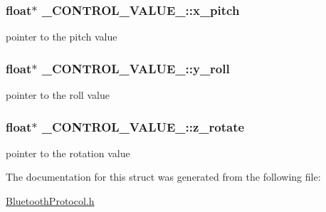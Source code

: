 \subsubsection[{\texorpdfstring{x\+\_\+pitch}{x_pitch}}]{\setlength{\rightskip}{0pt plus 5cm}float$\ast$ \+\_\+\+C\+O\+N\+T\+R\+O\+L\+\_\+\+V\+A\+L\+U\+E\+\_\+\+::x\+\_\+pitch}\hypertarget{struct___c_o_n_t_r_o_l___v_a_l_u_e___a86ebefe208904bd4f58d8c7306dd9f16}{}\label{struct___c_o_n_t_r_o_l___v_a_l_u_e___a86ebefe208904bd4f58d8c7306dd9f16}
pointer to the pitch value 
\subsubsection[{\texorpdfstring{y\+\_\+roll}{y_roll}}]{\setlength{\rightskip}{0pt plus 5cm}float$\ast$ \+\_\+\+C\+O\+N\+T\+R\+O\+L\+\_\+\+V\+A\+L\+U\+E\+\_\+\+::y\+\_\+roll}\hypertarget{struct___c_o_n_t_r_o_l___v_a_l_u_e___a2f8a834c72db81f047ea707ff307cf1d}{}\label{struct___c_o_n_t_r_o_l___v_a_l_u_e___a2f8a834c72db81f047ea707ff307cf1d}
pointer to the roll value 
\subsubsection[{\texorpdfstring{z\+\_\+rotate}{z_rotate}}]{\setlength{\rightskip}{0pt plus 5cm}float$\ast$ \+\_\+\+C\+O\+N\+T\+R\+O\+L\+\_\+\+V\+A\+L\+U\+E\+\_\+\+::z\+\_\+rotate}\hypertarget{struct___c_o_n_t_r_o_l___v_a_l_u_e___ab31b08cbe82159ccf182a784cd6e395d}{}\label{struct___c_o_n_t_r_o_l___v_a_l_u_e___ab31b08cbe82159ccf182a784cd6e395d}
pointer to the rotation value 

The documentation for this struct was generated from the following file\+:\begin{DoxyCompactItemize}
\item 
\hyperlink{_bluetooth_protocol_8h}{Bluetooth\+Protocol.\+h}\end{DoxyCompactItemize}
